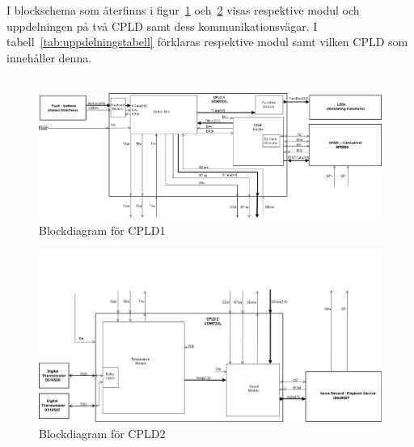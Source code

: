 \documentclass[a4paper,11pt]{article}
\begin{document}
	I blockschema som återfinns i figur~\ref{fig:blocks1} och~\ref{fig:blocks2} visas respektive modul och uppdelningen på två CPLD samt dess kommunikationsvägar. I tabell~\ref{tab:uppdelningstabell} förklaras respektive modul samt vilken CPLD som innehåller denna.\\\\

	\begin{figure} [H]
		  	
			\centering
			\includegraphics[width=1\textwidth]{BlockDiagramCPLD1.png}
		  	\caption{Blockdiagram för CPLD1}
			\label{fig:blocks1}
	\end{figure}

	\begin{figure}[H]
		  	
			\centering
			\includegraphics[width=1\textwidth]{BlockDiagramCPLD2.png}
			\caption{Blockdiagram för CPLD2}
			\label{fig:blocks2}
	\end{figure}
\end{document}
